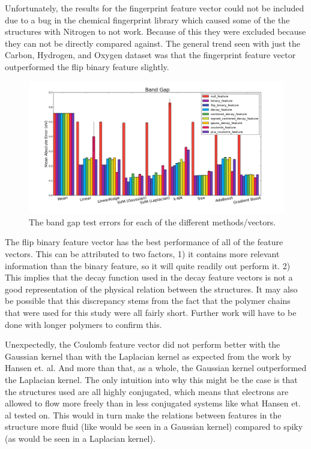 \documentclass[10pt, oneside]{article}   	%
\begin{document}
Unfortunately, the results for the fingerprint feature vector could not be included due to a bug in the chemical fingerprint library which caused some of the the structures with Nitrogen to not work. Because of this they were excluded because they can not be directly compared against. The general trend seen with just the Carbon, Hydrogen, and Oxygen dataset was that the fingerprint feature vector outperformed the flip binary feature slightly.

\begin{figure}[H]
\begin{center}
\includegraphics [width=.8\textwidth]{gap_results.png}
\caption{The band gap test errors for each of the different methods/vectors.}\label{gap}
\end{center}
\end{figure}

The flip binary feature vector has the best performance of all of the feature vectors. This can be attributed to two factors, 1) it contains more relevant information than the binary feature, so it will quite readily out perform it. 2) This implies that the decay function used in the decay feature vectors is not a good representation of the physical relation between the structures. It may also be possible that this discrepancy stems from the fact that the polymer chains that were used for this study were all fairly short. Further work will have to be done with longer polymers to confirm this.

Unexpectedly, the Coulomb feature vector did not perform better with the Gaussian kernel than with the Laplacian kernel as expected from the work by Hansen et. al\cite{Hansen}. And more than that, as a whole, the Gaussian kernel outperformed the Laplacian kernel. The only intuition into why this might be the case is that the structures used are all highly conjugated, which means that electrons are allowed to flow more freely than in less conjugated systems like what Hansen et. al tested on. This would in turn make the relations between features in the structure more fluid (like would be seen in a Gaussian kernel) compared to spiky (as would be seen in a Laplacian kernel).
\end{document}
